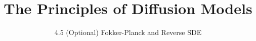﻿%

\graphicspath{{../images/}}
\title{The Principles of Diffusion Models}
\subtitle{4.5 (Optional) Fokker-Planck and Reverse SDE}


\begin{frame}
    \titlepage
\end{frame}


